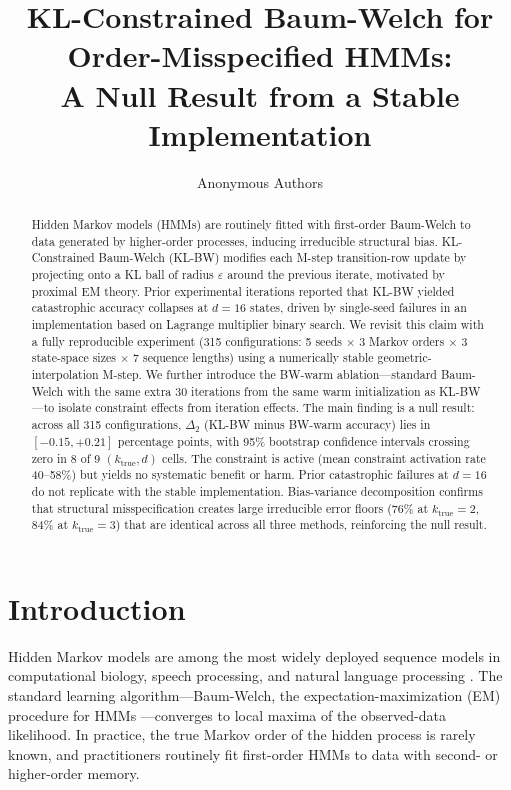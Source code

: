 \documentclass[11pt,letterpaper]{article}
\title{\textbf{KL-Constrained Baum-Welch for Order-Misspecified HMMs:\\
A Null Result from a Stable Implementation}}
\author{Anonymous Authors}
\date{}
\begin{document}
\maketitle

\begin{abstract}
Hidden Markov models (HMMs) are routinely fitted with first-order Baum-Welch to data generated by higher-order processes,
inducing irreducible structural bias. KL-Constrained Baum-Welch (KL-BW) modifies each M-step transition-row update by projecting
onto a KL ball of radius $\varepsilon$ around the previous iterate, motivated by proximal EM theory. Prior experimental
iterations reported that KL-BW yielded catastrophic accuracy collapses at $d=16$ states, driven by single-seed failures
in an implementation based on Lagrange multiplier binary search. We revisit this claim with a fully reproducible experiment
(315 configurations: 5 seeds $\times$ 3 Markov orders $\times$ 3 state-space sizes $\times$ 7 sequence lengths) using a
numerically stable geometric-interpolation M-step. We further introduce the BW-warm ablation---standard Baum-Welch with the
same extra 30 iterations from the same warm initialization as KL-BW---to isolate constraint effects from iteration effects.
The main finding is a null result: across all 315 configurations, $\Delta_2$ (KL-BW minus BW-warm accuracy) lies in $[-0.15,
+0.21]$ percentage points, with 95\% bootstrap confidence intervals crossing zero in 8 of 9 $(k_\text{true}, d)$ cells.
The constraint is active (mean constraint activation rate 40--58\%) but yields no systematic benefit or harm. Prior catastrophic
failures at $d=16$ do not replicate with the stable implementation. Bias-variance decomposition confirms that structural
misspecification creates large irreducible error floors (76\% at $k_\text{true}=2$, 84\% at $k_\text{true}=3$) that are
identical across all three methods, reinforcing the null result.
\end{abstract}

\section{Introduction}

Hidden Markov models are among the most widely deployed sequence models in computational biology,
speech processing, and natural language processing \citep{Rabiner1989}. The standard learning algorithm---Baum-Welch, the
expectation-maximization (EM) procedure for HMMs \citep{Baum1970}---converges to local maxima of the observed-data likelihood.
In practice, the true Markov order of the hidden process is rarely known, and practitioners routinely fit first-order HMMs
to data with second- or higher-order memory.
\end{document}
